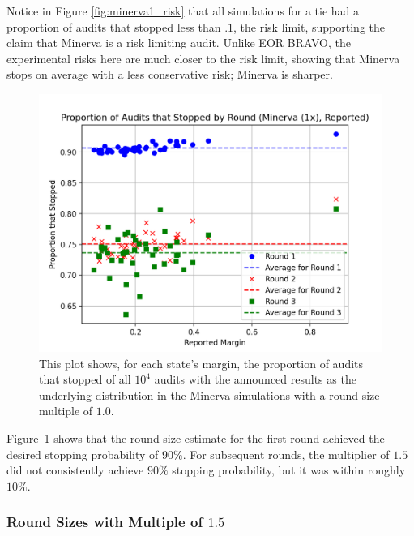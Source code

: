 \documentclass[runningheads]{llncs}
\begin{document}
Notice in Figure \ref{fig:minerva1_risk} that all simulations for a tie had a proportion of audits that stopped less than $.1$, the risk limit, supporting
the claim that Minerva is a risk limiting audit. 
Unlike EOR BRAVO, the experimental risks here are much closer to the risk limit,
showing that Minerva stops on average with a less conservative risk; Minerva is sharper.

\begin{figure}
\includegraphics[width=\textwidth]{minerva_multiround_1x_10^4/sprobs_first_three.png}
\caption{This plot shows, for each state's margin, the proportion of audits that stopped of
all $10^4$ audits with the announced results as the underlying distribution
in the Minerva simulations with a round size multiple of $1.0$.}
\label{fig:minerva1_sprob}
\end{figure}

Figure~\ref{fig:minerva1_sprob} shows that the round size estimate for the first round achieved the desired
stopping probability of $90\%$. For subsequent rounds, the multiplier of $1.5$ did not consistently achieve $90\%$ stopping
probability, but it was within  roughly $10\%$. 

\subsubsection{Round Sizes with Multiple of $1.5$}

\end{document}
